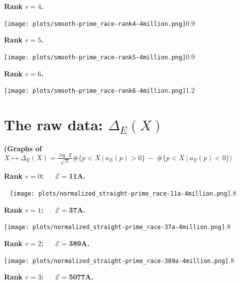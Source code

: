 \documentclass[11pt]{article}
\theoremstyle{plain}
\theoremstyle{definition}
\numberwithin{equation}{section}
\numberwithin{figure}{section}
\numberwithin{table}{section}
\begin{document}
  \vskip30pt


  \centerline{\bf Rank $r=4$.}


  \vskip10pt



     \texttt{[image: plots/smooth-prime\_race-rank4-4million.png]}{0.9}~\label{sr4}

 \newpage


  \centerline{\bf Rank $r=5$.}


     \texttt{[image: plots/smooth-prime\_race-rank5-4million.png]}{0.9}~\label{sr5}


  \vskip30pt


  \centerline{\bf Rank $r=6$.}


 \vskip20pt



     \texttt{[image: plots/smooth-prime\_race-rank6-4million.png]}{1.2}~\label{sr6}
      \newpage
\section{The raw data: $\Delta_E(X)$}
\vskip40pt

  \centerline{\bf (Graphs of \ \   $X\mapsto \Delta_E(X)=  {\frac{\log\ X}{\sqrt X}}\#\{ p < X\ | \ a_E(p) > 0\}\ - \ \#\{ p < X\ | \  a_E(p) < 0\})$}  \vskip40pt


 \centerline{\bf Rank $r=0$:\ \ \  ${\mathcal E}=$11A.}~ \texttt{[image: plots/normalized\_straight-prime\_race-11a-4million.png]}{.8}~\label{nr11}


\vskip40pt



  \centerline{\bf Rank $r=1$:\ \ \  ${\mathcal E}=$37A.}


 \vskip60pt



     \texttt{[image: plots/normalized\_straight-prime\_race-37a-4million.png]}{.8}~\label{nr37}
%

  \vskip40pt



  \centerline{\bf Rank $r=2$:\ \ \  ${\mathcal E}=$389A.}


  \vskip20pt



     \texttt{[image: plots/normalized\_straight-prime\_race-389a-4million.png]}{.8}~\label{nr389}


   \vskip60pt


  \centerline{\bf Rank $r=3$:\ \ \  ${\mathcal E}=$5077A.}
\end{document}
